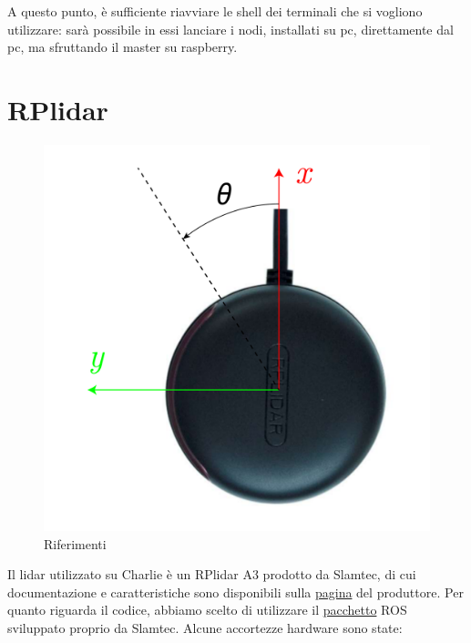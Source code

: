 A questo punto, è sufficiente riavviare le shell dei terminali che si vogliono utilizzare: sarà possibile in essi lanciare i nodi, installati su pc, 
direttamente dal pc, ma sfruttando il master su raspberry.

\section{RPlidar}
\begin{figure}[] 
	\centering    
	\includegraphics[height=.2\textheight]{rplidar_axis.pdf}
	\caption{Riferimenti}
	\label{fig: rplidar axis}
\end{figure}

Il lidar utilizzato su Charlie è un RPlidar A3 prodotto da Slamtec, di cui documentazione e caratteristiche sono disponibili sulla
\href{https://www.slamtec.com/en/Lidar/A3}{pagina} del produttore.
Per quanto riguarda il codice, abbiamo scelto di utilizzare il \href{https://wiki.ros.org/rplidar}{pacchetto} ROS sviluppato proprio da Slamtec. 
Alcune accortezze hardware sono state:

